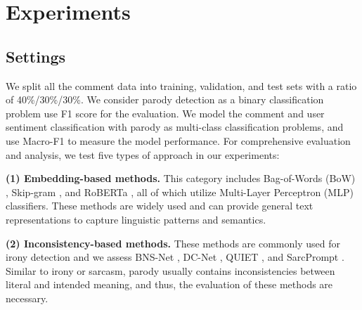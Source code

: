 \section{Experiments}
\label{sec:Experiments}


\subsection{Settings}\label{sec:exp_settings}

We split all the comment data into training, validation, and test sets with a ratio of 40\%/30\%/30\%. We consider parody detection as a binary classification problem use F1 score for the evaluation. We model the comment and user sentiment classification with parody as multi-class classification problems, and use Macro-F1 to measure the model performance.
For comprehensive evaluation and analysis, we test five types of approach in our experiments:

\textbf{(1) Embedding-based methods.} This category includes Bag-of-Words (BoW) \citep{BoW}, Skip-gram \citep{Skip-gram}, and RoBERTa \citep{RoBERTa}, all of which utilize Multi-Layer Perceptron (MLP) classifiers. These methods are widely used and can provide general text representations to capture linguistic patterns and semantics.

\textbf{(2) Inconsistency-based methods.} These methods are commonly used for irony detection and we assess BNS-Net \citep{BNS-Net}, DC-Net \citep{DC-Net}, QUIET \citep{QUIET}, and SarcPrompt \citep{SarcPrompt}. Similar to irony or sarcasm, parody usually contains inconsistencies between literal and intended meaning, and thus, the evaluation of these methods are necessary.

